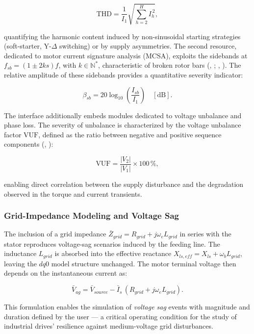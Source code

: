 \begin{equation}
\label{eq:thd_en}
\text{THD} = \frac{1}{I_1}\sqrt{\sum_{h=2}^{H} I_h^{\,2}},
\end{equation}

\noindent quantifying the harmonic content induced by non-sinusoidal starting strategies (soft-starter, Y-$\Delta$ switching) or by supply asymmetries. The second resource, dedicated to motor current signature analysis (MCSA), exploits the sidebands at $f_{sb} = (1 \pm 2ks)f$, with $k \in \mathbb{N}^{*}$, characteristic of broken rotor bars (\citeauthor{arkan2005modelling}, \citeyear{arkan2005modelling}; \citeauthor{tuanmohamad2024advance}, \citeyear{tuanmohamad2024advance}). The relative amplitude of these sidebands provides a quantitative severity indicator:

\begin{equation}
\label{eq:mcsa_severity_en}
\beta_{sb} = 20\log_{10}\!\left(\frac{I_{sb}}{I_1}\right) \quad [\mathrm{dB}].
\end{equation}

The interface additionally embeds modules dedicated to voltage unbalance and phase loss. The severity of unbalance is characterized by the voltage unbalance factor $\text{VUF}$, defined as the ratio between negative and positive sequence components (\citeauthor{karakas2009aggregation}, \citeyear{karakas2009aggregation}):

\begin{equation}
\label{eq:vuf_en}
\text{VUF} = \frac{|V_2|}{|V_1|} \times 100\,\%,
\end{equation}

\noindent enabling direct correlation between the supply disturbance and the degradation observed in the torque and current transients.

\subsubsection{Grid-Impedance Modeling and Voltage Sag}

The inclusion of a grid impedance $\bar{Z}_{grid} = R_{grid} + j\omega_e L_{grid}$ in series with the stator reproduces voltage-sag scenarios induced by the feeding line. The inductance $L_{grid}$ is absorbed into the effective reactance $X_{ls,eff} = X_{ls} + \omega_b L_{grid}$, leaving the $dq0$ model structure unchanged. The motor terminal voltage then depends on the instantaneous current as:

\begin{equation}
\label{eq:vag_grid_en}
\bar{V}_{ag} = \bar{V}_{source} - \bar{I}_s\,(R_{grid} + j\omega_e L_{grid}).
\end{equation}

\noindent This formulation enables the simulation of \textit{voltage sag} events with magnitude and duration defined by the user — a critical operating condition for the study of industrial drives' resilience against medium-voltage grid disturbances.
